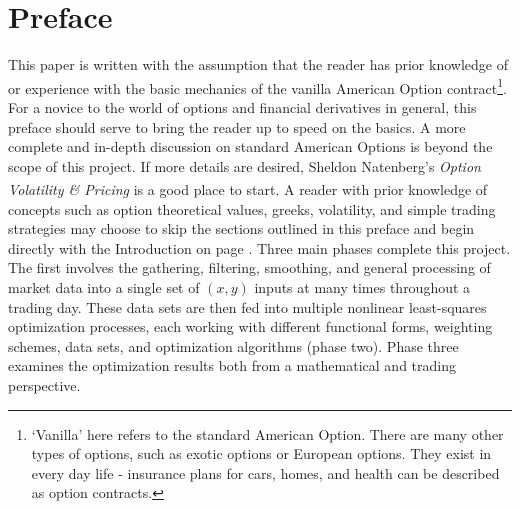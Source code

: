 \documentclass[12pt, a4paper, notitlepage]{article}
\numberwithin{equation}{subsection}
\numberwithin{figure}{subsection}
\numberwithin{table}{subsection}
\newcommand{\newpar}{\newline \newline}
\begin{document}
\begin{abstract}

\end{abstract}

\newpage
\tableofcontents

\newpage
\listoffigures

\newpage
\listoftables

\newpage
{}
\section{Preface} \label{sec:Preface}
This paper is written with the assumption that the reader has prior knowledge of or experience with the basic mechanics of the vanilla American Option contract\footnote{`Vanilla' here refers to the standard American Option.  There are many other types of options, such as exotic options or European options.  They exist in every day life - insurance plans for cars, homes, and health can be described as option contracts.}.  For a novice to the world of options and financial derivatives in general, this preface should serve to bring the reader up to speed on the basics.  A more complete and in-depth discussion on standard American Options is beyond the scope of this project.  If more details are desired, Sheldon Natenberg's \textit{Option Volatility \& Pricing}\textsuperscript{\cite{Natenberg}} is a good place to start.  A reader with prior knowledge of concepts such as option theoretical values, greeks, volatility, and simple trading strategies may choose to skip the sections outlined in this preface and begin directly with the Introduction on page \pageref{sec:Introduction}.
\newpar
Three main phases complete this project.  The first involves the gathering, filtering, smoothing, and general processing of market data into a single set of $(x,y)$ inputs at many times throughout a trading day.  These data sets are then fed into multiple nonlinear least-squares optimization processes, each working with different functional forms, weighting schemes, data sets, and optimization algorithms (phase two).  Phase three examines the optimization results both from a mathematical and trading perspective.
\end{document}
